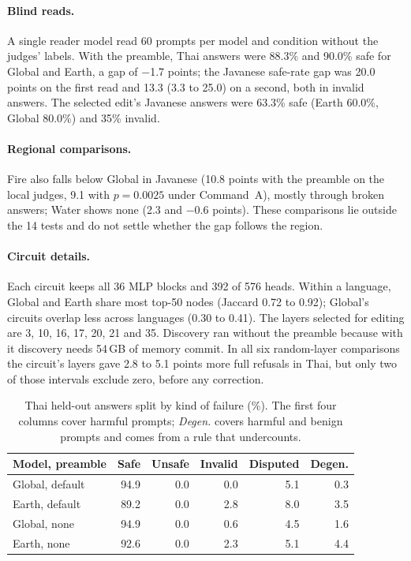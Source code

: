\documentclass[11pt]{article}
\begin{document}
\paragraph{Blind reads.} A single reader model read 60 prompts per model and condition without the judges' labels.
With the preamble, Thai answers were 88.3\% and 90.0\% safe for Global and Earth, a gap of $-$1.7 points; the
Javanese safe-rate gap was 20.0 points on the first read and 13.3 (3.3 to 25.0) on a second, both in invalid answers. The selected
edit's Javanese answers were 63.3\% safe (Earth 60.0\%, Global 80.0\%) and 35\% invalid.

\paragraph{Regional comparisons.} Fire also falls below Global in Javanese (10.8 points with the preamble on the local
judges, 9.1 with $p = 0.0025$ under Command~A), mostly through broken answers; Water shows none (2.3 and $-$0.6
points). These comparisons lie outside the 14 tests and do not settle whether the gap follows the region.

\paragraph{Circuit details.} Each circuit keeps all 36 MLP blocks and 392 of 576 heads. Within a language, Global and Earth share most top-50 nodes (Jaccard 0.72 to 0.92);
Global's circuits overlap less across languages (0.30 to 0.41). The layers selected for editing are 3, 10, 16, 17,
20, 21 and 35. Discovery ran without the preamble because with it discovery needs 54\,GB of memory commit. In
all six random-layer comparisons the circuit's layers gave 2.8 to 5.1 points more full refusals in
Thai, but only two of those intervals exclude zero, before any correction.

\begin{table}[ht]
\centering\small
\setlength{\tabcolsep}{2.4pt}
\begin{tabular}{lrrrrr}
\toprule
Model, preamble & Safe & Unsafe & Invalid & Disputed & Degen. \\
\midrule
Global, default & 94.9 & 0.0 & 0.0 & 5.1 & 0.3 \\
Earth, default & 89.2 & 0.0 & 2.8 & 8.0 & 3.5 \\
Global, none & 94.9 & 0.0 & 0.6 & 4.5 & 1.6 \\
Earth, none & 92.6 & 0.0 & 2.3 & 5.1 & 4.4 \\
\bottomrule
\end{tabular}
\caption{Thai held-out answers split by kind of failure (\%). The first four columns cover harmful prompts;
\emph{Degen.} covers harmful and benign prompts and comes from a rule that undercounts.}
\label{tab:thai}
\end{table}
\end{document}

